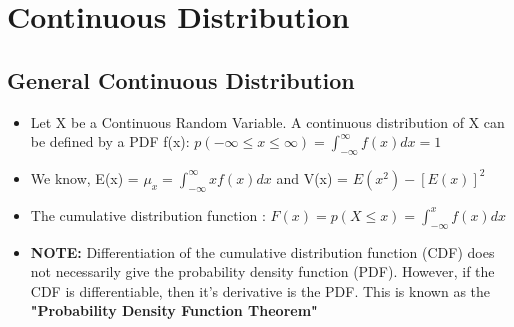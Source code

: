 \documentclass[8pt]{report}
\begin{document}
	\section{Continuous Distribution}
		\subsection{General Continuous Distribution}
			\begin{itemize}
				\item Let X be a Continuous Random Variable. A continuous distribution of X can be defined by a PDF f(x): $p(-\infty \le x \le \infty) = \int_{-\infty}^{\infty}f(x)dx=1$
				\item We know, E(x) = $\mu_x = \int_{-\infty}^{\infty}xf(x)dx$ and V(x) = $E(x^2)-[E(x)]^2$ 
				\item The cumulative distribution function : $F(x) = p(X\le x) = \int_{-\infty}^{x}f(x)dx$
				\item \textbf{NOTE: } Differentiation of the cumulative distribution function (CDF) does not necessarily give the probability density function (PDF). However, if the CDF is differentiable, then it's derivative is the PDF. This is known as the \textbf{"Probability Density Function Theorem"}
			\end{itemize}\hrulefill
\end{document}
